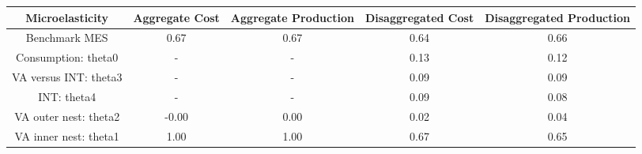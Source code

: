 \begin{table}[!ht]
\setlength\tabcolsep{0.425em}
\setlength\aboverulesep{0pt}
\setlength\belowrulesep{0.2em}
\centering
\begin{threeparttable}
\begin{tabular}{ccccc}
\toprule[0.1em]
Microelasticity & Aggregate Cost & Aggregate Production & Disaggregated Cost & Disaggregated Production \\[0.2em]
\midrule[0.075em]
Benchmark MES & 0.67 & 0.67 & 0.64 & 0.66 \\[0.2em]
Consumption: theta0 & - & - & 0.13 & 0.12 \\[0.2em]
VA versus INT: theta3 & - & - & 0.09 & 0.09 \\[0.2em]
INT: theta4 & - & - & 0.09 & 0.08 \\[0.2em]
VA outer nest: theta2 & -0.00 & 0.00 & 0.02 & 0.04 \\[0.2em]
VA inner nest: theta1 & 1.00 & 1.00 & 0.67 & 0.65 \\[0.2em]
\bottomrule[0.1em]
\end{tabular}
\end{threeparttable}
\end{table}


